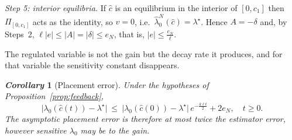 \documentclass[letterpaper, 10pt, conference]{ieeeconf}
\makeatletter
\newtheorem{corollary}{\it \textbf{Corollary}}
\newcommand{\rev}[1]{#1}
\renewenvironment{proof}[1][\proofname]{\par
  \pushQED{\qed}%
  \normalfont\topsep6\p@\@plus6\p@\relax
  \trivlist
  \item[\hskip\labelsep\itshape #1\@addpunct{.}]\ignorespaces
}{%
  \popQED\endtrivlist\@endpefalse
}
\renewenvironment{proof}[1][\proofname]{\par
  \pushQED{\qed}%
  \normalfont\topsep6\p@\@plus6\p@\relax
  \trivlist
  \item[\hskip\labelsep\itshape #1\@addpunct{.}]\ignorespaces
}{%
  \popQED\endtrivlist\@endpefalse
}
\makeatother
\begin{document}
\begin{proof}
\rev{\emph{Step 5: interior equilibria.} If $\widehat c$ is an equilibrium
in the interior of $[0,c_1]$ then $\Pi_{[0,c_1]}$ acts as the identity, so
$v=0$, i.e.\ $\widehat\lambda_0^N(\widehat c)=\lambda^\star$. Hence
$A=-\delta$ and, by Steps~2,
$\ell|e|\le|A|=|\delta|\le e_N$, that is,
$|e|\le\frac{e_N}{\ell}$.}
\end{proof}

\rev{The regulated variable is not the gain but the decay rate it produces, and
for that variable the sensitivity constant disappears.}
\begin{corollary}[\rev{Placement error}]
\label{cor:placement}
\rev{Under the hypotheses of Proposition~\ref{prop:feedback},}
\begin{equation}
\rev{\bigl|\lambda_0(\widehat c(t))-\lambda^\star\bigr|
\ \le\ \bigl|\lambda_0(\widehat c(0))-\lambda^\star\bigr|\,
e^{-\frac{k\ell t}{2}}+2e_N ,\quad t\ge0 .}
\label{eq:placement}
\end{equation}
\rev{The asymptotic placement error is therefore at most twice the estimator
error, however sensitive $\lambda_0$ may be to the gain.}
\end{corollary}
\end{document}
